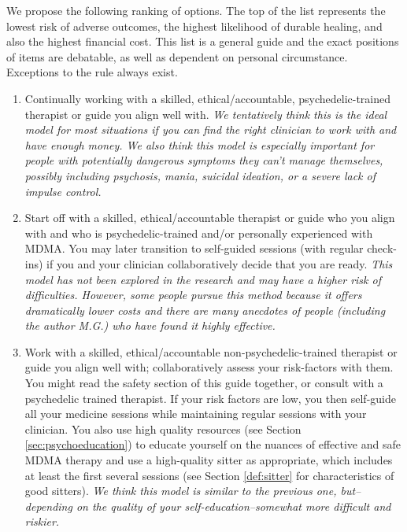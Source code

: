 \documentclass[12pt,letterpaper]{book}
\begin{document}
We propose the following ranking of options. The top of the list represents the lowest risk of adverse outcomes, the highest likelihood of durable healing, and also the highest financial cost. This list is a general guide and the exact positions of items are debatable, as well as dependent on personal circumstance. Exceptions to the rule always exist.
\begin{enumerate}
    \item Continually working with a skilled, ethical/accountable, psychedelic-trained therapist or guide you align well with. \textit{We tentatively think this is the ideal model for most situations if you can find the right clinician to work with and have enough money. We also think this model is especially important for people with potentially dangerous symptoms they can't manage themselves, possibly including psychosis, mania, suicidal ideation, or a severe lack of impulse control.}
    \item Start off with a skilled, ethical/accountable therapist or guide who you align with and who is psychedelic-trained and/or personally experienced with MDMA. You may later transition to self-guided sessions (with regular check-ins) if you and your clinician collaboratively decide that you are ready. \textit{This model has not been explored in the research and may have a higher risk of difficulties. However, some people pursue this method because it offers dramatically lower costs and there are many anecdotes of people (including the author M.G.) who have found it highly effective.}
    \item Work with a skilled, ethical/accountable non-psychedelic-trained therapist or guide you align well with; collaboratively assess your risk-factors with them. You might read the safety section of this guide together, or consult with a psychedelic trained therapist. If your risk factors are low, you then self-guide all your medicine sessions while maintaining regular sessions with your clinician. You also use high quality resources (see Section \ref{sec:psychoeducation}) to educate yourself on the nuances of effective and safe MDMA therapy and use a high-quality sitter as appropriate, which includes at least the first several sessions (see Section \ref{def:sitter} for characteristics of good sitters). \textit{We think this model is similar to the previous one, but–depending on the quality of your self-education–somewhat more difficult and riskier.}

\end{enumerate}
\end{document}

